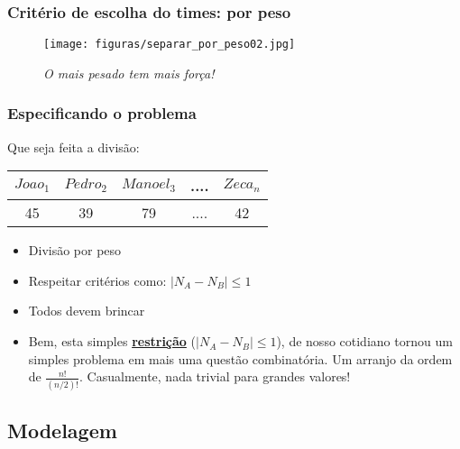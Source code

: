 \documentclass{beamer}
\begin{document}

\begin{frame}[fragile]
\frametitle{Critério de escolha do times: por peso}

\begin{figure}[ht!]
 \centering
 \texttt{[image: figuras/separar\_por\_peso02.jpg]}
\caption{\textit{O mais pesado tem mais força!}} 
\end{figure}

\end{frame}


\begin{frame}[fragile]%
\frametitle{Especificando o problema}

\begin{block}{Que seja feita a divisão:}
 
\begin{center}
\begin{tabular}{|c|c|c|c|c|}
\hline
$Joao_1$ & $Pedro_2$ & $Manoel_3$ & .... & $Zeca_n$ \\ \hline
45 & 39 & 79 & .... & 42  \\ \hline
\end{tabular}
\end{center}

\begin{itemize}
\item Divisão  por peso
\item Respeitar  critérios como: $|N_A - N_B| \le 1$
\item Todos devem brincar

\item \textsf{Bem, esta simples {\bf \underline{restrição}} ({\bf $|N_A - N_B| \le 1$}), de nosso cotidiano tornou um simples problema em mais uma questão combinatória.
 Um arranjo da ordem de  $\frac{n!}{(n/2)!}$.
 Casualmente, nada trivial  para grandes valores! }
 \end{itemize}
 
\end{block}
\end{frame}


\subsection{Modelagem}
\end{document}
